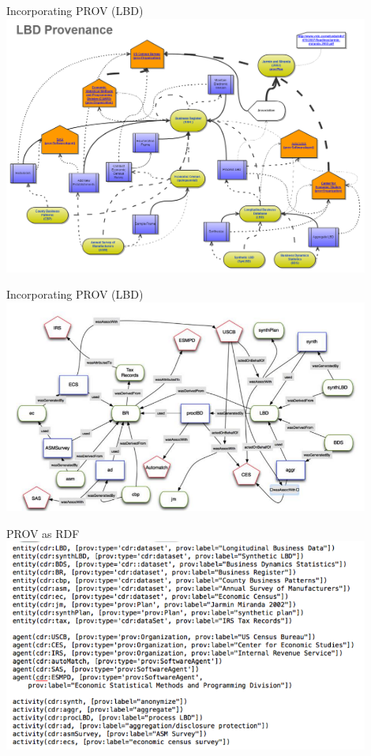\begin{frame}{Incorporating PROV (LBD)}
\includegraphics[width=0.9\textwidth]{LBD_PROV_-_WIP.png}
\end{frame}

\begin{frame}{Incorporating PROV (LBD)}
\includegraphics[width=0.9\textwidth]{LBD_Prov_simplified.png}
\end{frame}

\begin{frame}{PROV as RDF}
\includegraphics[width=0.9\textwidth]{LBD_Prov_simplified_text.png}
\end{frame}

